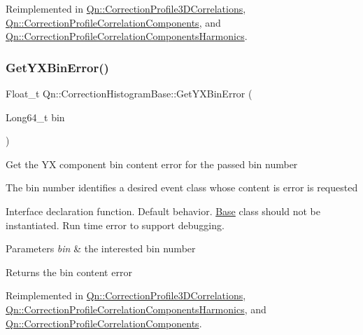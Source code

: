 Reimplemented in \mbox{\hyperlink{classQn_1_1CorrectionProfile3DCorrelations_a27127ed9f52b6b4b7ec2df59f88c457f}{Qn\+::\+Correction\+Profile3\+D\+Correlations}}, \mbox{\hyperlink{classQn_1_1CorrectionProfileCorrelationComponents_a81c1b7bd19dca53c3e1e9407daffc1e6}{Qn\+::\+Correction\+Profile\+Correlation\+Components}}, and \mbox{\hyperlink{classQn_1_1CorrectionProfileCorrelationComponentsHarmonics_a14b776082f56bec058ef29e6ae69fed1}{Qn\+::\+Correction\+Profile\+Correlation\+Components\+Harmonics}}.

\mbox{\label{classQn_1_1CorrectionHistogramBase_a07055fbf2b7df0ee3912fd68c18572c0}} 
\subsubsection{\texorpdfstring{Get\+Y\+X\+Bin\+Error()}{GetYXBinError()}\hspace{0.1cm}{\footnotesize\ttfamily [1/2]}}
{\footnotesize\ttfamily Float\+\_\+t Qn\+::\+Correction\+Histogram\+Base\+::\+Get\+Y\+X\+Bin\+Error (\begin{DoxyParamCaption}\item[{Long64\+\_\+t}]{bin }\end{DoxyParamCaption})\hspace{0.3cm}{\ttfamily [virtual]}}

Get the YX component bin content error for the passed bin number

The bin number identifies a desired event class whose content is error is requested

Interface declaration function. Default behavior. \mbox{\hyperlink{classBase}{Base}} class should not be instantiated. Run time error to support debugging.


\begin{DoxyParams}{Parameters}
{\em bin} & the interested bin number \\
\hline
\end{DoxyParams}
\begin{DoxyReturn}{Returns}
the bin content error 
\end{DoxyReturn}


Reimplemented in \mbox{\hyperlink{classQn_1_1CorrectionProfile3DCorrelations_a40f70d3632b88451fb7f4bea2cd40650}{Qn\+::\+Correction\+Profile3\+D\+Correlations}}, \mbox{\hyperlink{classQn_1_1CorrectionProfileCorrelationComponentsHarmonics_a2fb45faa92d49c538af35235ced49240}{Qn\+::\+Correction\+Profile\+Correlation\+Components\+Harmonics}}, and \mbox{\hyperlink{classQn_1_1CorrectionProfileCorrelationComponents_a91f05094196842c16be6f6fc2bb7dad8}{Qn\+::\+Correction\+Profile\+Correlation\+Components}}.

